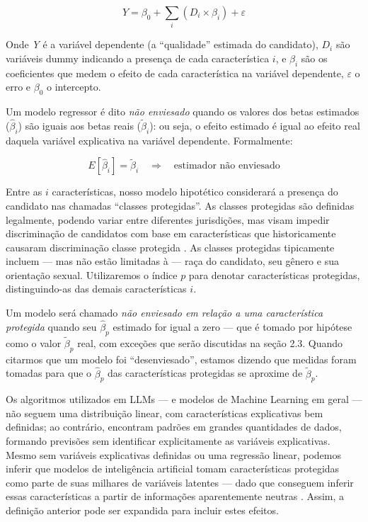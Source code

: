 \documentclass[12pt,a4paper]{article}
\begin{document}
\begin{equation}
Y = \beta_0 + \sum_i (D_i \times \beta_i) + \varepsilon
\end{equation}

Onde \textit{Y} é a variável dependente (a ``qualidade'' estimada do
candidato), $D_i$ são variáveis dummy indicando a presença de cada
característica $i$, e $\beta_i$ são os coeficientes que medem o efeito de
cada característica na variável dependente, $\varepsilon$ o erro e $\beta_0$ o
intercepto.

Um modelo regressor é dito \textit{não enviesado} quando os valores dos betas
estimados ($\hat{\beta}_i$) são iguais aos betas reais ($\tilde{\beta}_i$): ou seja, o efeito
estimado é igual ao efeito real daquela variável explicativa na variável
dependente. Formalmente:

\begin{equation}
E[\hat{\beta}_i] = \tilde{\beta}_i \quad \Rightarrow \quad \text{estimador não enviesado}
\end{equation}

Entre as $i$ características, nosso modelo hipotético considerará a
presença do candidato nas chamadas ``classes protegidas''. As classes
protegidas são definidas legalmente, podendo variar entre diferentes
jurisdições, mas visam impedir discriminação de candidatos com base em
características que historicamente causaram discriminação classe
protegida \citep{heymann2020}. As classes protegidas tipicamente
incluem --- mas não estão limitadas à --- raça do candidato, seu gênero
e sua orientação sexual. Utilizaremos o índice $p$ para denotar
características protegidas, distinguindo-as das demais características
$i$.

Um modelo será chamado \textit{não enviesado em relação a uma característica
protegida} quando seu $\hat{\beta}_p$ estimado for igual a zero --- que é tomado
por hipótese como o valor $\tilde{\beta}_p$ real, com exceções que serão discutidas
na seção 2.3. Quando citarmos que um modelo foi ``desenviesado'',
estamos dizendo que medidas foram tomadas para que o $\hat{\beta}_p$ das
características protegidas se aproxime de $\tilde{\beta}_p$.

Os algoritmos utilizados em LLMs --- e modelos de Machine Learning em
geral --- não seguem uma distribuição linear, com características
explicativas bem definidas; ao contrário, encontram padrões em grandes
quantidades de dados, formando previsões sem identificar explicitamente
as variáveis explicativas. Mesmo sem variáveis explicativas definidas ou
uma regressão linear, podemos inferir que modelos de inteligência
artificial tomam características protegidas como parte de suas milhares
de variáveis latentes --- dado que conseguem inferir essas
características a partir de informações aparentemente neutras \citep{bai2024}. Assim, a definição anterior pode ser expandida para incluir
estes efeitos.
\end{document}

